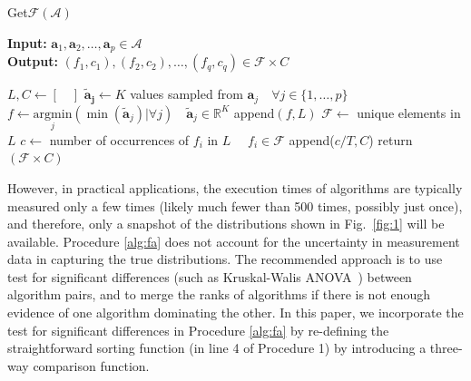 \documentclass[conference]{IEEEtran}
\begin{document}
\begin{algorithm}
	\caption{ Get$\mathcal{F}$$(\mathcal{A})$ }
	\label{alg:fa}
	\hspace*{\algorithmicindent} \textbf{Input: } $ \mathbf{a}_1,\mathbf{a}_2 ,\dots, \mathbf{a}_p\in \mathcal{A}$ \\
	\hspace*{\algorithmicindent} \textbf{Output: } $ (f_1,c_1), (f_2, c_2), \dots, (f_q,c_q) \in \mathcal{F} \times C  $
	\begin{algorithmic}[1] 
		\State $L, C \leftarrow [ \quad ]$ 
		\State $\mathbf{\tilde{a}_j} \leftarrow K $ values sampled from $\mathbf{a}_j \quad \forall j \in \{1,\dots,p\}$ 
		\State $ f \leftarrow \underset{j}{\mathrm{argmin}}(\min(\mathbf{\tilde{a}}_j) | \forall j) \quad \mathbf{\tilde{a}}_j \in \mathbb{R}^{K}$
	    \State append$(f,L)$
		\EndFor
		\State $\mathcal{F} \leftarrow $ unique elements in $L$ 
        \State $c \leftarrow$ number of occurrences of $f_i$ in $L$ $\quad f_i \in \mathcal{F}$
		\State append($c/T, C$)
		\EndFor
		\State return $(\mathcal{F} \times C)$
              \end{algorithmic}
\end{algorithm}

However, in practical applications, the execution times of algorithms are typically
measured only a few times (likely much fewer than 500 times, possibly just once), and therefore, only a snapshot of the distributions
shown in Fig.~\ref{fig:1} will be available. Procedure \ref{alg:fa} does not account for the uncertainty in measurement data in capturing the true distributions. 
The recommended approach is to use test for significant differences (such as Kruskal-Walis
ANOVA~\cite{hoefler2015scientific}) between algorithm pairs, and to merge the ranks of algorithms if there is not enough
evidence of one algorithm dominating the other. In this paper, we incorporate the test for significant differences in
Procedure \ref{alg:fa} by re-defining the straightforward sorting function (in line 4 of Procedure 1) by introducing a
three-way comparison function. 
\end{document}
